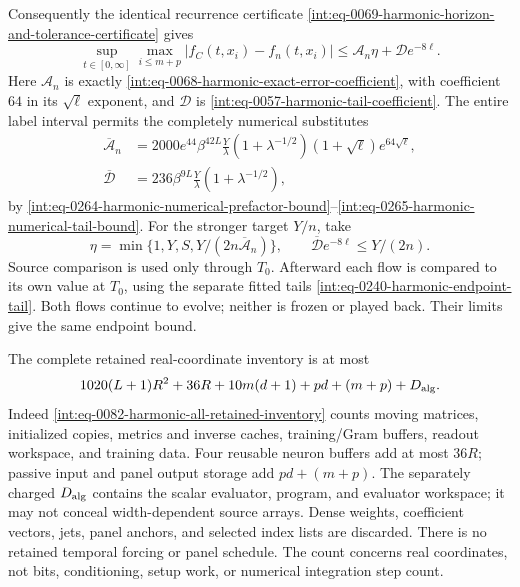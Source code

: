 Consequently the identical recurrence certificate
\eqref{int:eq-0069-harmonic-horizon-and-tolerance-certificate} gives
\[
 \sup_{t\in[0,\infty]}\max_{i\le m+p}
       |f_C(t,x_i)-f_n(t,x_i)|
 \le\mathcal A_n\eta+\mathcal D e^{-8\ell}.
\]
Here \(\mathcal A_n\) is exactly
\eqref{int:eq-0068-harmonic-exact-error-coefficient}, with coefficient
\(64\) in its \(\sqrt\ell\) exponent, and \(\mathcal D\) is
\eqref{int:eq-0057-harmonic-tail-coefficient}.  The entire label
interval permits the completely numerical substitutes
\begin{align*}
 \overline{\mathcal A}_n
 &=2000e^{44}\beta^{42L}\frac Y\lambda
            (1+\lambda^{-1/2})(1+\sqrt\ell)e^{64\sqrt\ell},\\
 \overline{\mathcal D}
 &=236\beta^{9L}\frac Y\lambda(1+\lambda^{-1/2}),
\end{align*}
by \eqref{int:eq-0264-harmonic-numerical-prefactor-bound}--\eqref{int:eq-0265-harmonic-numerical-tail-bound}.
For the stronger target \(Y/n\), take
\begin{equation}
 \eta=\min\{1,Y,S,Y/(2n\overline{\mathcal A}_n)\},\qquad
 \overline{\mathcal D}e^{-8\ell}\le Y/(2n).
 \label{eq:panel-tolerance}
\end{equation}
Source comparison is used only through \(T_0\).  Afterward each flow
is compared to its own value at \(T_0\), using the separate fitted
tails \eqref{int:eq-0240-harmonic-endpoint-tail}.  Both flows continue
to evolve; neither is frozen or played back.  Their limits give the
same endpoint bound.

The complete retained real-coordinate inventory is at most
\begin{equation}
 1020(L+1)R^2+36R+10m(d+1)+pd+(m+p)+D_{\rm alg}.
 \label{eq:panel-exact-inventory}
\end{equation}
Indeed \eqref{int:eq-0082-harmonic-all-retained-inventory} counts
moving matrices, initialized copies, metrics and inverse caches,
training/Gram buffers, readout workspace, and training data.
Four reusable neuron buffers add at most \(36R\); passive input and
panel output storage add \(pd+(m+p)\).  The separately charged
\(D_{\rm alg}\) contains the scalar evaluator, program, and evaluator
workspace; it may not conceal width-dependent source arrays.
Dense weights, coefficient vectors, jets, panel anchors, and selected
index lists are discarded.  There is no retained temporal forcing or
panel schedule.  The count concerns real coordinates, not bits,
conditioning, setup work, or numerical integration step count.

